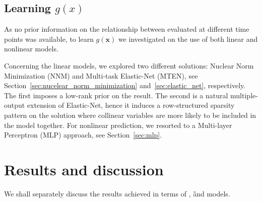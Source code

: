 
\subsection{Learning $g(x)$}

As no prior information on the relationship between \PCOs evaluated at different time points was available, to learn $g(\bm{x})$ we investigated on the use of both linear and nonlinear models.

Concerning the linear models, we explored two different solutions: Nuclear Norm Minimization (\ac{NNM}) and Multi-task Elastic-Net (\ac{MTEN}), see Section~\ref{sec:nucelear_norm_minimization} and~\ref{sec:elastic_net}, respectively. The first imposes a low-rank prior on the result. The second is a natural multiple-output extension of Elastic-Net, hence it induces a row-structured sparsity pattern on the solution where collinear variables are more likely to be included in the model together. For nonlinear prediction, we resorted to a Multi-layer Perceptron (\ac{MLP}) approach, see Section~\ref{sec:mlp}.

\section{Results and discussion}\label{sec:aism_results}

We shall separately discuss the results achieved in terms of \F, \G and \FOG models.

